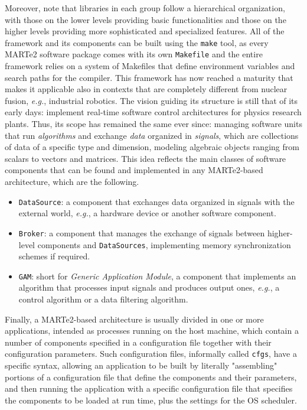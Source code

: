 Moreover, note that libraries in each group follow a hierarchical organization, with those on the lower levels providing basic functionalities and those on the higher levels providing more sophisticated and specialized features. All of the framework and its components can be built using the \texttt{make} tool, as every MARTe2 software package comes with its own \texttt{Makefile} and the entire framework relies on a system of Makefiles that define environment variables and search paths for the compiler. This framework has now reached a maturity that makes it applicable also in contexts that are completely different from nuclear fusion, \emph{e.g.}, industrial robotics. The vision guiding its structure is still that of its early days: implement real-time software control architectures for physics research plants. Thus, its scope has remained the same ever since: managing software units that run \emph{algorithms} and exchange \emph{data} organized in \emph{signals}, which are collections of data of a specific type and dimension, modeling algebraic objects ranging from scalars to vectors and matrices. This idea reflects the main classes of software components that can be found and implemented in any MARTe2-based architecture, which are the following.
\begin{itemize}
  \item \texttt{DataSource}: a component that exchanges data organized in signals with the external world, \emph{e.g.}, a hardware device or another software component.
  \item \texttt{Broker}: a component that manages the exchange of signals between higher-level components and \texttt{DataSources}, implementing memory synchronization schemes if required.
  \item \texttt{GAM}: short for \emph{Generic Application Module}, a component that implements an algorithm that processes input signals and produces output ones, \emph{e.g.}, a control algorithm or a data filtering algorithm.
\end{itemize}
Finally, a MARTe2-based architecture is usually divided in one or more applications, intended as processes running on the host machine, which contain a number of components specified in a configuration file together with their configuration parameters. Such configuration files, informally called \texttt{cfgs}, have a specific syntax, allowing an application to be built by literally "assembling" portions of a configuration file that define the components and their parameters, and then running the application with a specific configuration file that specifies the components to be loaded at run time, plus the settings for the OS scheduler.

